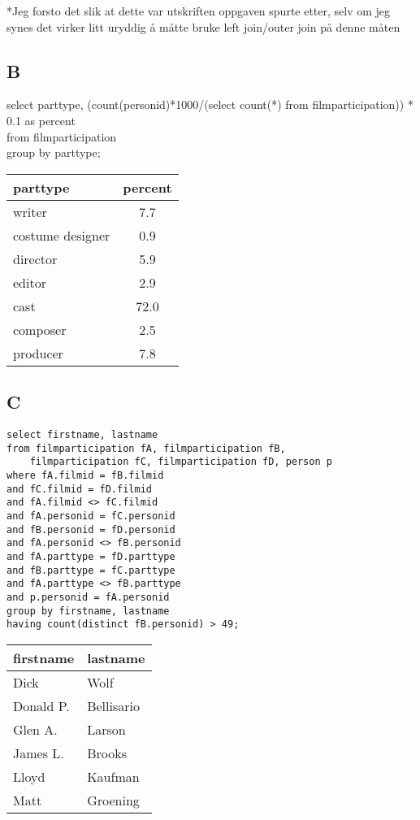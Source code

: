 \documentclass[12pt,norsk,a4paper]{article}
\begin{document}
*Jeg forsto det slik at dette var utskriften oppgaven spurte etter, selv om jeg synes det virker litt uryddig å måtte bruke left join/outer join på denne måten

\subsection*{B}
select parttype, (count(personid)*1000/(select count(*) from filmparticipation)) * 0.1 as percent \\
from filmparticipation\\
group by parttype;
 
 \begin{tabular}{l | c}
 parttype & percent \\
 \hline
  writer & 7.7 \\
  costume designer & 0.9 \\
  director & 5.9 \\
  editor & 2.9 \\
  cast & 72.0 \\
  composer & 2.5 \\
  producer & 7.8 \\
\end{tabular}
 
\subsection*{C}
\begin{lstlisting}
select firstname, lastname
from filmparticipation fA, filmparticipation fB, 
	filmparticipation fC, filmparticipation fD, person p
where fA.filmid = fB.filmid
and fC.filmid = fD.filmid
and fA.filmid <> fC.filmid
and fA.personid = fC.personid
and fB.personid = fD.personid
and fA.personid <> fB.personid
and fA.parttype = fD.parttype
and fB.parttype = fC.parttype
and fA.parttype <> fB.parttype
and p.personid = fA.personid
group by firstname, lastname
having count(distinct fB.personid) > 49;
\end{lstlisting}


\begin{tabular}{l | l}
firstname & lastname\\
\hline
Dick & Wolf\\ 
Donald P. & Bellisario\\
Glen A. & Larson\\
James L. & Brooks\\
Lloyd & Kaufman\\
Matt & Groening\\
\end{tabular}\\
\end{document}
